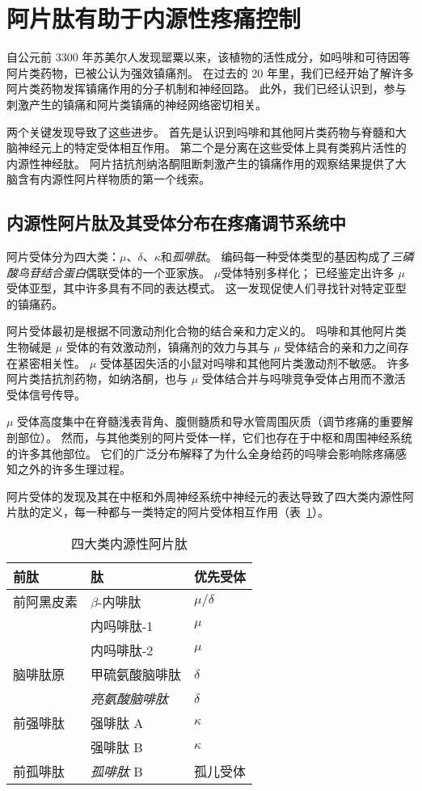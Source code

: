 \section{阿片肽有助于内源性疼痛控制}

自公元前 3300 年苏美尔人发现罂粟以来，该植物的活性成分，如吗啡和可待因等阿片类药物，已被公认为强效镇痛剂。
在过去的 20 年里，我们已经开始了解许多阿片类药物发挥镇痛作用的分子机制和神经回路。
此外，我们已经认识到，参与刺激产生的镇痛和阿片类镇痛的神经网络密切相关。


两个关键发现导致了这些进步。
首先是认识到吗啡和其他阿片类药物与脊髓和大脑神经元上的特定受体相互作用。
第二个是分离在这些受体上具有类鸦片活性的内源性神经肽。
阿片拮抗剂纳洛酮阻断刺激产生的镇痛作用的观察结果提供了大脑含有内源性阿片样物质的第一个线索。



\subsection{内源性阿片肽及其受体分布在疼痛调节系统中}

阿片受体分为四大类：$\mu$、$ \delta $、$ \kappa $和\textit{孤啡肽}。
编码每一种受体类型的基因构成了\textit{三磷酸鸟苷结合蛋白}偶联受体的一个亚家族。
$\mu$受体特别多样化；
已经鉴定出许多 $\mu$ 受体亚型，其中许多具有不同的表达模式。
这一发现促使人们寻找针对特定亚型的镇痛药。


阿片受体最初是根据不同激动剂化合物的结合亲和力定义的。
吗啡和其他阿片类生物碱是 $\mu$ 受体的有效激动剂，镇痛剂的效力与其与 $\mu$ 受体结合的亲和力之间存在紧密相关性。
$\mu$ 受体基因失活的小鼠对吗啡和其他阿片类激动剂不敏感。
许多阿片类拮抗剂药物，如纳洛酮，也与 $\mu$ 受体结合并与吗啡竞争受体占用而不激活受体信号传导。


$\mu$ 受体高度集中在脊髓浅表背角、腹侧髓质和导水管周围灰质（调节疼痛的重要解剖部位）。
然而，与其他类别的阿片受体一样，它们也存在于中枢和周围神经系统的许多其他部位。
它们的广泛分布解释了为什么全身给药的吗啡会影响除疼痛感知之外的许多生理过程。


阿片受体的发现及其在中枢和外周神经系统中神经元的表达导致了四大类内源性阿片肽的定义，每一种都与一类特定的阿片受体相互作用（表~\ref{tab:20_1}）。


\begin{table}[htbp]
	\caption{四大类内源性阿片肽} \label{tab:20_1} \centering
	\begin{tabular}{lll}
		\toprule
		前肽 & 肽 & 优先受体 \\
		\midrule
		前阿黑皮素 & $\beta$-内啡肽 & $\mu / \delta$  \\
		 & 内吗啡肽-1 & $\mu$  \\
		 & 内吗啡肽-2 & $\mu$  \\
		脑啡肽原 & 甲硫氨酸脑啡肽 & $\delta$  \\
		 & \textit{亮氨酸脑啡肽} & $\delta$  \\
		前强啡肽 & 强啡肽 A & $\kappa$  \\
		 & 强啡肽 B & $\kappa$  \\
		前孤啡肽 & \textit{孤啡肽} B & 孤儿受体  \\
		\bottomrule
	\end{tabular}
\end{table}


